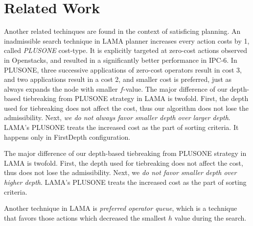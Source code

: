 \begin{figure}[htbp]
 \centering
 \caption{}
 \label{portfolio}
\end{figure}


\section{Related Work}
\label{sec-4}

Another related techinques are found in the context of satisficing planning.
An inadmissible search technique in LAMA planner \cite{richter2010lama}
increases every action costs by 1, called \emph{PLUSONE} cost-type.
It is explicitly targeted at zero-cost actions observed in Openstacks,
and resulted in a significantly better performance in IPC-6.
In PLUSONE, three successive
applications of zero-cost operators result in cost 3, and two
applications result in a cost 2, and smaller cost is preferred, just as
\astar always expands the node with smaller $f$-value.
The major difference of our depth-based tiebreaking from PLUSONE
strategy in LAMA is twofold.  First, the depth used for tiebreaking does
not affect the cost, thus our algorithm does not lose the
admissibility. Next, \emph{we do not always favor smaller depth over
larger depth}. LAMA's PLUSONE treats the increased cost as the part of
sorting criteria. It happens only in FirstDepth configuration.

The major difference of our depth-based tiebreaking from PLUSONE
strategy in LAMA is twofold.  First, the depth used for tiebreaking does
not affect the cost, thus does not lose the admissibility. Next, we
\emph{do not favor smaller depth over higher depth}. LAMA's PLUSONE
treats the increased cost as the part of sorting criteria. 

Another technique in LAMA is \emph{preferred operator queue},
which is a technique that favors those actions which decreased the
smallest $h$ value during the search.


